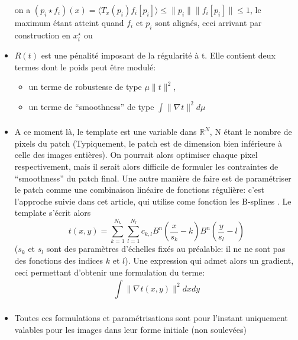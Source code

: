 \documentclass{article}
\begin{document}
\begin{itemize}
\begin{itemize}
        \end{itemize}
        on a $ (p_i \star f_i)(x) = \mathcal  \langle T_x(p_i) f_i[p_i] \rangle  \leq
        \|p_i\| \|f_i[p_i]\| \leq  1$, le maximum étant atteint quand $ f_i $ et $ p_i $ 
        sont alignés, ceci arrivant par construction en $ {x}^{\star}_i $
        ou 
    \item $ R(t) $ est une pénalité imposant de la régularité à t. Elle contient deux
      termes dont le poids peut être modulé:
      \begin{itemize}
        \item un terme de robustesse de type $ \mu\|t\|^2 $,
        \item un terme de ``smoothness'' de type $ \int\limits_{  }^{  } \| \nabla_{
          } t \|^2 d \mu $
      \end{itemize}
    \item A ce moment là, le template est une variable dans $ \mathbb{R}^N$, N étant le
      nombre de pixels du patch (Typiquement, le patch est de dimension bien
        inférieure à celle des images entières). On pourrait alors optimiser chaque pixel
        respectivement, mais il serait alors difficile de formuler les contraintes de
        ``smoothness'' du patch final. Une autre manière de faire est de paramétriser le
        patch comme une combinaison linéaire de fonctions régulière: c'est l'approche
        suivie dans cet article, qui utilise come fonction les B-splines \cite{bspline}. Le template
        s'écrit alors
        \[
            t(x, y) = \sum\limits_{ k=1 }^{ N_k } \sum\limits_{ l=1 }^{ N_l } c_{k, l} B^n \left (
            \frac{x}{s_k} - k \right ) B^n \left ( \frac{y}{s_{l}} - l \right )
            \label{eq:spline} \tag{1}
        \] 
        ($ s_k $ et $ s_l $ sont des paramètres d'échelles fixés au préalable: il ne
        ne sont pas des fonctions des indices $ k $ et $ l $).
        Une expression qui admet alors un gradient, ceci permettant d'obtenir une
        formulation du terme: 
        \[
            \int\limits_{  }^{  } \| \nabla_{  } t(x, y) \|^2 dx dy
        \] 
    \item Toutes ces formulations et paramétrisations sont pour l'instant uniquement
      valables pour les images dans leur forme initiale (non soulevées)
\end{itemize}
\end{document}
